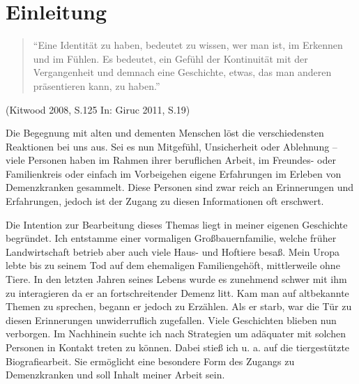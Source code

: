 \section{Einleitung}
\label{sec:k1_Einleitung}

\begin{quotation}
"`Eine Identität zu haben, bedeutet zu wissen, wer man ist, im Erkennen und im Fühlen. Es bedeutet, ein Gefühl der Kontinuität mit der Vergangenheit und demnach eine Geschichte, etwas, das man anderen präsentieren kann, zu haben."'
\end{quotation}

\begin{flushright}
(Kitwood 2008, S.125 In: Giruc 2011, S.19)
\end{flushright}

Die Begegnung mit alten und dementen Menschen löst die verschiedensten Reaktionen bei uns aus. Sei es nun Mitgefühl, Unsicherheit oder Ablehnung -- viele Personen haben im Rahmen ihrer beruflichen Arbeit, im Freundes- oder Familienkreis oder einfach im Vorbeigehen eigene Erfahrungen im Erleben von Demenzkranken gesammelt. Diese Personen sind zwar reich an Erinnerungen und Erfahrungen, jedoch ist der Zugang zu diesen Informationen oft erschwert.
 
Die Intention zur Bearbeitung dieses Themas liegt in meiner eigenen Geschichte begründet. Ich entstamme einer vormaligen Großbauernfamilie, welche früher Landwirtschaft betrieb aber auch viele Haus- und Hoftiere besaß. Mein Uropa lebte bis zu seinem Tod auf dem ehemaligen Familiengehöft, mittlerweile ohne Tiere. In den letzten Jahren seines Lebens wurde es zunehmend schwer mit ihm zu interagieren da er an fortschreitender Demenz litt. Kam man auf altbekannte Themen zu sprechen, begann er jedoch zu Erzählen. Als er starb, war die Tür zu diesen Erinnerungen unwiderruflich zugefallen. Viele Geschichten blieben nun verborgen. Im Nachhinein suchte ich nach Strategien um adäquater mit solchen Personen in Kontakt treten zu können. Dabei stieß ich u. a. auf die tiergestützte Biografiearbeit. Sie ermöglicht eine besondere Form des Zugangs zu Demenzkranken und soll Inhalt meiner Arbeit sein.

